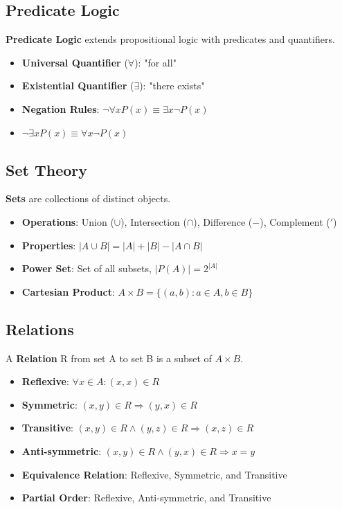 \documentclass[12pt,a4paper]{report}
\begin{document}
\subsection{Predicate Logic}
\begin{concept}
\textbf{Predicate Logic} extends propositional logic with predicates and quantifiers.
\begin{itemize}
    \item \textbf{Universal Quantifier} ($\forall$): "for all"
    \item \textbf{Existential Quantifier} ($\exists$): "there exists"
    \item \textbf{Negation Rules}: $\neg \forall x P(x) \equiv \exists x \neg P(x)$
    \item $\neg \exists x P(x) \equiv \forall x \neg P(x)$
\end{itemize}
\end{concept}

\subsection{Set Theory}
\begin{concept}
\textbf{Sets} are collections of distinct objects.
\begin{itemize}
    \item \textbf{Operations}: Union ($\cup$), Intersection ($\cap$), Difference ($-$), Complement ($'$)
    \item \textbf{Properties}: $|A \cup B| = |A| + |B| - |A \cap B|$
    \item \textbf{Power Set}: Set of all subsets, $|P(A)| = 2^{|A|}$
    \item \textbf{Cartesian Product}: $A \times B = \{(a,b) : a \in A, b \in B\}$
\end{itemize}
\end{concept}

\subsection{Relations}
\begin{concept}
A \textbf{Relation} R from set A to set B is a subset of $A \times B$.
\begin{itemize}
    \item \textbf{Reflexive}: $\forall x \in A: (x,x) \in R$
    \item \textbf{Symmetric}: $(x,y) \in R \Rightarrow (y,x) \in R$
    \item \textbf{Transitive}: $(x,y) \in R \land (y,z) \in R \Rightarrow (x,z) \in R$
    \item \textbf{Anti-symmetric}: $(x,y) \in R \land (y,x) \in R \Rightarrow x = y$
    \item \textbf{Equivalence Relation}: Reflexive, Symmetric, and Transitive
    \item \textbf{Partial Order}: Reflexive, Anti-symmetric, and Transitive
\end{itemize}
\end{concept}
\end{document}
